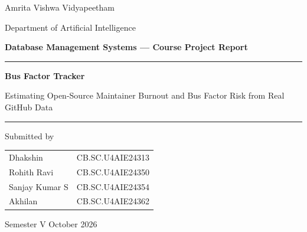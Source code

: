 \documentclass[11pt,a4paper]{report}
\begin{document}
\begin{titlepage}
\centering
\vspace*{1cm}
{\large Amrita Vishwa Vidyapeetham\par}
{\normalsize Department of Artificial Intelligence\par}
\vspace{2.2cm}
{\Large\bfseries Database Management Systems --- Course Project Report\par}
\vspace{1.2cm}
{\rule{\linewidth}{0.6pt}\par\vspace{0.4cm}}
{\Huge\bfseries Bus Factor Tracker\par}
\vspace{0.4cm}
{\Large Estimating Open-Source Maintainer Burnout and Bus Factor Risk from Real GitHub Data\par}
\vspace{0.4cm}
{\rule{\linewidth}{0.6pt}\par}
\vspace{2cm}
{\large Submitted by\par}
\vspace{0.4cm}
{\large
\begin{tabular}{l l}
Dhakshin & CB.SC.U4AIE24313 \\
Rohith Ravi & CB.SC.U4AIE24350 \\
Sanjay Kumar S & CB.SC.U4AIE24354 \\
Akhilan & CB.SC.U4AIE24362 \\
\end{tabular}\par}
\vfill
{\large Semester V \quad\textbullet\quad October 2026\par}
\end{titlepage}
\end{document}
